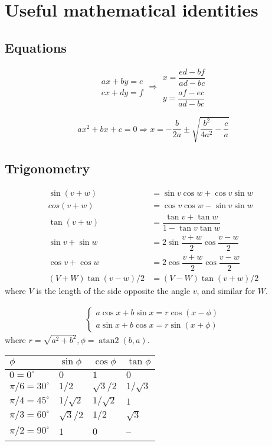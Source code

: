 
\chapter{Useful mathematical identities}

\section{Equations}
$$\begin{aligned}ax+by=e\\cx+dy=f\end{aligned}
\Rightarrow
\begin{aligned}x=\dfrac{ed-bf}{ad-bc}\\y=\dfrac{af-ec}{ad-bc}\end{aligned}$$

$$ax^2+bx+c=0 \Rightarrow x = -\frac{b}{2a}\pm\sqrt{\frac{b^2}{4a^2}-\frac{c}{a}}$$

\section{Trigonometry}
\begin{align*}
\sin(v+w)&{}=\sin v\cos w+\cos v\sin w\\
cos(v+w)&{}=\cos v\cos w-\sin v\sin w\\
\tan(v+w)&{}=\dfrac{\tan v+\tan w}{1-\tan v\tan w}\\
\sin v+\sin w&{}=2\sin\dfrac{v+w}{2}\cos\dfrac{v-w}{2}\\
\cos v+\cos w&{}=2\cos\dfrac{v+w}{2}\cos\dfrac{v-w}{2}\\
(V+W)\tan(v-w)/2&{}=(V-W)\tan(v+w)/2
\end{align*}
where $V$ is the length of the side opposite the angle $v$, and
similar for $W$.

\begin{align*}
\begin{cases}
a\cos x+b\sin x=r\cos(x-\phi)\\
a\sin x+b\cos x=r\sin(x+\phi)
\end{cases}
\end{align*}
where $r=\sqrt{a^2+b^2}, \phi=\operatorname{atan2}(b,a)$.

\begin{center}
\begin{tabular}{|l|l|l|l|}
\hline
$\phi$ & $\sin\phi$ & $\cos\phi$ & $\tan\phi$ \\
\hline
$0 = 0^\circ$ & $0$ & $1$ & $0$\\
\hline
$\pi/6 = 30^\circ$ & $1/2$ & $\sqrt3/2$ & $1/\sqrt3$\\
\hline
$\pi/4 = 45^\circ$ & $1/\sqrt2$ & $1/\sqrt2$ & $1$\\
\hline
$\pi/3 = 60^\circ$ & $\sqrt3/2$ & $1/2$ & $\sqrt3$\\
\hline
$\pi/2 = 90^\circ$ & $1$ & $0$ & --\\
\hline
\end{tabular}
\end{center}

